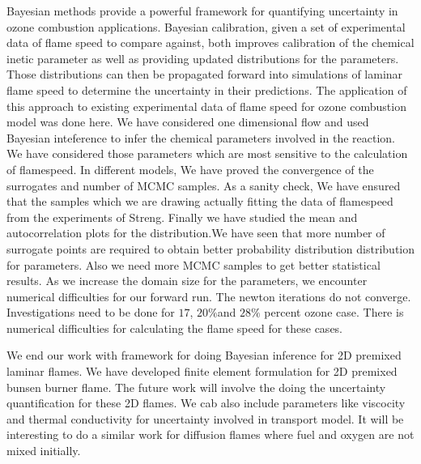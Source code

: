  Bayesian methods provide a powerful framework for quantifying uncertainty in ozone
combustion applications. Bayesian calibration, given a set of experimental data of flame speed to compare
against, both improves calibration of the chemical inetic parameter as well as providing
updated distributions for the parameters. Those distributions can then be
propagated forward into simulations of laminar flame speed to determine the uncertainty in
their predictions. The application of this approach to existing experimental data of flame speed for ozone combustion model was done here.
 We have considered one dimensional flow and used Bayesian inteference to infer the chemical parameters involved in the reaction. We have considered those parameters which are most sensitive to the calculation of flamespeed. In different models, We have proved the convergence of the surrogates and  number of MCMC samples. As a sanity check, We have ensured that the samples which we are drawing actually fitting the data of flamespeed from the experiments of Streng\cite{Streng}. Finally we have studied the mean and autocorrelation plots for the distribution.We have seen that more number of surrogate points are required to obtain better probability distribution distribution for parameters. Also we need more MCMC samples to get better statistical results. As we increase the domain size for the parameters, we encounter numerical difficulties for our forward run. The newton iterations do not converge. Investigations need to be done for $17$, $20 \% $and $ 28 \% $ percent ozone case. There is numerical difficulties for calculating the flame speed for these cases.

We end our work with  framework for doing Bayesian inference for 2D premixed laminar flames. We have developed finite element formulation for 2D premixed bunsen burner flame. The future work will involve the doing the uncertainty quantification for these 2D flames. We cab also include parameters like viscocity and  thermal conductivity for uncertainty involved in transport model. It will be interesting to do a similar work for diffusion flames where fuel and oxygen are not mixed initially.


